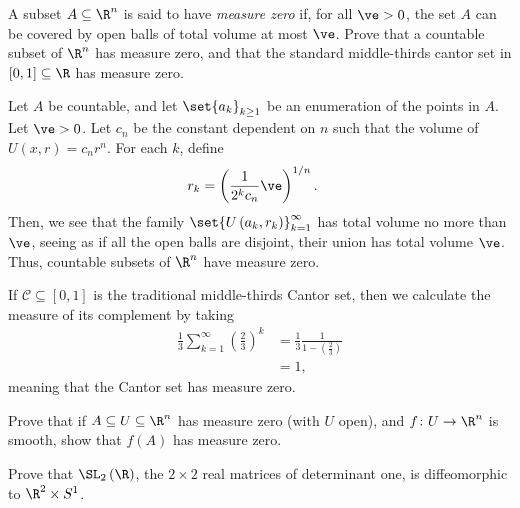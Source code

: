 \documentclass[10pt]{mypackage}
\begin{document}
\RaggedRight
\begin{problem}[Problem 1]
  A subset $A\subseteq \R^{n}$ is said to have \textit{measure zero} if, for all $\ve > 0$, the set $A$ can be covered by open balls of total volume at most $\ve$. Prove that a countable subset of $\R^{n}$ has measure zero, and that the standard middle-thirds cantor set in $[0,1]\subseteq \R$ has measure zero.
\end{problem}
\begin{solution}
  Let $A$ be countable, and let $\set{a_k}_{k\geq 1}$ be an enumeration of the points in $A$. Let $\ve > 0$. Let $c_{n}$ be the constant dependent on $n$ such that the volume of $U\left( x,r \right) = c_nr^{n}$. For each $k$, define
  \begin{align*}
    r_k &= \left( \frac{1}{2^{k}c_n} \ve \right)^{1/n}.
  \end{align*}
  Then, we see that the family $\set{U\left( a_k,r_k \right)}_{k=1}^{\infty}$ has total volume no more than $\ve$, seeing as if all the open balls are disjoint, their union has total volume $\ve$. Thus, countable subsets of $\R^{n}$ have measure zero.\newline

  If $\mathcal{C}\subseteq [0,1]$ is the traditional middle-thirds Cantor set, then we calculate the measure of its complement by taking
  \begin{align*}
    \frac{1}{3}\sum_{k=1}^{\infty} \left( \frac{2}{3} \right)^{k} &= \frac{1}{3} \frac{1}{1-\left( \frac{2}{3} \right)}\\
                                                                  &= 1,
  \end{align*}
  meaning that the Cantor set has measure zero.
\end{solution}
\begin{problem}[Problem 2]
  Prove that if $A\subseteq U\subseteq \R^{n}$ has measure zero (with $U$ open), and $f\colon U\rightarrow \R^{n}$ is smooth, show that $f(A)$ has measure zero.
\end{problem}
\begin{problem}[Problem 5]
  Prove that $\SL_2\left( \R \right)$, the $2\times 2$ real matrices of determinant one, is diffeomorphic to $\R^{2}\times S^{1}$.
\end{problem}
\end{document}
